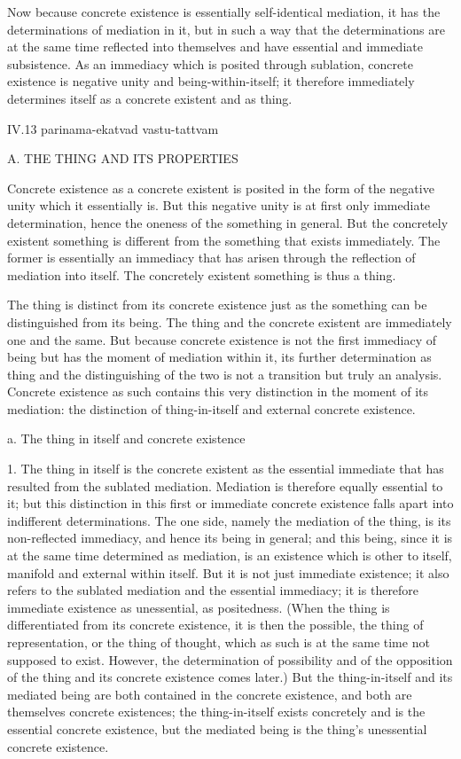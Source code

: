 Now because concrete existence is
essentially self-identical mediation,
it has the determinations of mediation in it,
but in such a way that the determinations are
at the same time reflected into themselves
and have essential and immediate subsistence.
As an immediacy which is posited through sublation,
concrete existence is negative unity and being-within-itself;
it therefore immediately determines itself
as a concrete existent and as thing.

IV.13
parinama-ekatvad vastu-tattvam

A. THE THING AND ITS PROPERTIES

Concrete existence as a concrete existent is posited in
the form of the negative unity which it essentially is.
But this negative unity is at first only immediate determination,
hence the oneness of the something in general.
But the concretely existent something is different
from the something that exists immediately.
The former is essentially an immediacy that has arisen
through the reflection of mediation into itself.
The concretely existent something is thus a thing.

The thing is distinct from its concrete existence
just as the something can be distinguished from its being.
The thing and the concrete existent
are immediately one and the same.
But because concrete existence is not
the first immediacy of being
but has the moment of mediation within it,
its further determination as thing
and the distinguishing of the two is
not a transition but truly an analysis.
Concrete existence as such contains
this very distinction in the moment of its mediation:
the distinction of thing-in-itself
and external concrete existence.

a. The thing in itself and concrete existence

1. The thing in itself is the concrete existent
as the essential immediate that has resulted
from the sublated mediation.
Mediation is therefore equally essential to it;
but this distinction in this first
or immediate concrete existence
falls apart into indifferent determinations.
The one side, namely the mediation of the thing,
is its non-reflected immediacy,
and hence its being in general;
and this being, since it is
at the same time determined as mediation,
is an existence which is other to itself,
manifold and external within itself.
But it is not just immediate existence;
it also refers to the sublated mediation
and the essential immediacy;
it is therefore immediate existence
as unessential, as positedness.
(When the thing is differentiated
from its concrete existence,
it is then the possible,
the thing of representation,
or the thing of thought,
which as such is at the same time
not supposed to exist.
However, the determination of possibility
and of the opposition of the thing
and its concrete existence comes later.)
But the thing-in-itself and its mediated being are
both contained in the concrete existence,
and both are themselves concrete existences;
the thing-in-itself exists concretely
and is the essential concrete existence,
but the mediated being is
the thing's unessential concrete existence.

